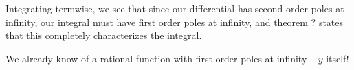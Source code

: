 Integrating termwise, we see that since our differential has second
order poles at infinity, our integral must have first order poles
at infinity, and theorem ? states that this completely
characterizes the integral.

We already know of a rational function with first order poles
at infinity -- $y$ itself!

\endexample

